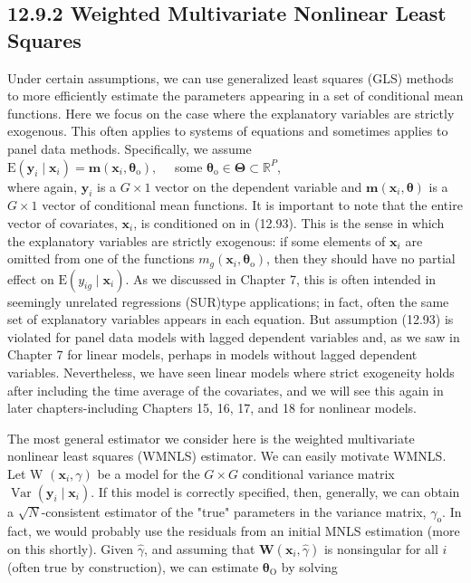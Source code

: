 \documentclass[10pt]{article}
\begin{document}
\subsection*{12.9.2 Weighted Multivariate Nonlinear Least Squares}
Under certain assumptions, we can use generalized least squares (GLS) methods to more efficiently estimate the parameters appearing in a set of conditional mean functions. Here we focus on the case where the explanatory variables are strictly exogenous. This often applies to systems of equations and sometimes applies to panel data methods. Specifically, we assume\\
$\mathrm{E}\left(\mathbf{y}_{i} \mid \mathbf{x}_{i}\right)=\mathbf{m}\left(\mathbf{x}_{i}, \boldsymbol{\theta}_{\mathrm{o}}\right), \quad$ some $\boldsymbol{\theta}_{\mathrm{o}} \in \boldsymbol{\Theta} \subset \mathbb{R}^{P}$,\\
where again, $\mathbf{y}_{i}$ is a $G \times 1$ vector on the dependent variable and $\mathbf{m}\left(\mathbf{x}_{i}, \boldsymbol{\theta}\right)$ is a $G \times 1$ vector of conditional mean functions. It is important to note that the entire vector of covariates, $\mathbf{x}_{i}$, is conditioned on in (12.93). This is the sense in which the explanatory variables are strictly exogenous: if some elements of $\mathbf{x}_{i}$ are omitted from one of the functions $m_{g}\left(\mathbf{x}_{i}, \boldsymbol{\theta}_{\mathrm{o}}\right)$, then they should have no partial effect on $\mathrm{E}\left(y_{i g} \mid \mathbf{x}_{i}\right)$. As we discussed in Chapter 7, this is often intended in seemingly unrelated regressions (SUR)type applications; in fact, often the same set of explanatory variables appears in each equation. But assumption (12.93) is violated for panel data models with lagged dependent variables and, as we saw in Chapter 7 for linear models, perhaps in models without lagged dependent variables. Nevertheless, we have seen linear models where strict exogeneity holds after including the time average of the covariates, and we will see this again in later chapters-including Chapters 15, 16, 17, and 18 for nonlinear models.

The most general estimator we consider here is the weighted multivariate nonlinear least squares (WMNLS) estimator. We can easily motivate WMNLS. Let W $\left(\mathbf{x}_{i}, \gamma\right)$ be a model for the $G \times G$ conditional variance matrix $\operatorname{Var}\left(\mathbf{y}_{i} \mid \mathbf{x}_{i}\right)$. If this model is correctly specified, then, generally, we can obtain a $\sqrt{N}$-consistent estimator of the "true" parameters in the variance matrix, $\gamma_{\mathrm{o}}$. In fact, we would probably use the residuals from an initial MNLS estimation (more on this shortly). Given $\hat{\gamma}$, and assuming that $\mathbf{W}\left(\mathbf{x}_{i}, \hat{\gamma}\right)$ is nonsingular for all $i$ (often true by construction), we can estimate $\boldsymbol{\theta}_{\mathrm{O}}$ by solving
\end{document}

